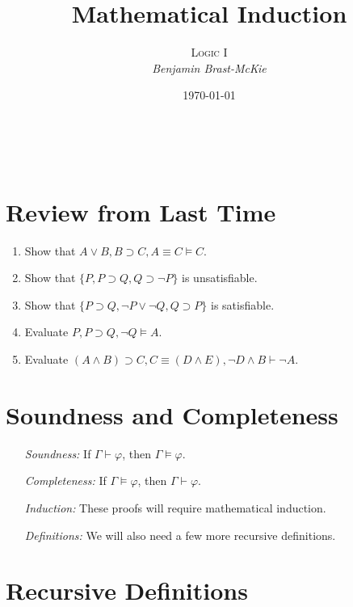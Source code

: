 \documentclass[a4paper, 11pt]{article} %
\title{\textbf{Mathematical Induction}} %
\author{\textsc{Logic I}\\ \em Benjamin Brast-McKie} %
\date{\today} %
\makeatletter
\newcommand{\set}[1]{\lbrace#1\rbrace} %
\renewcommand{\maketitle}{ %
\begin{flushright} %
{\LARGE\@title} %

\vspace{10pt} %

{\@author} %
\\\@date %

\vspace{0pt} %
\end{flushright}
}
\makeatother
\begin{document}
\maketitle %

\thispagestyle{empty}


\section*{Review from Last Time}

\begin{enumerate}
  \item Show that $A \vee B, B \supset C, A \equiv C \vDash C$.
  \item Show that $\{P, P \supset Q, Q \supset \neg P\}$ is unsatisfiable. 
  \item Show that $\set{P \supset Q, \neg P \vee \neg Q, Q \supset P}$ is satisfiable.
  \item Evaluate $P, P \supset Q, \neg Q \vDash A$.
  \item Evaluate $(A \wedge B) \supset C, C \equiv (D \wedge E), \neg D \wedge B \vdash \neg A$.
\end{enumerate}


\section*{Soundness and Completeness}

\begin{enumerate}
  \item[\it Soundness:] If $\Gamma \vdash \varphi$, then $\Gamma \vDash \varphi$.
  \item[\it Completeness:] If $\Gamma \vDash \varphi$, then $\Gamma \vdash \varphi$.
  \item[\it Induction:] These proofs will require mathematical induction. 
  \item[\it Definitions:] We will also need a few more recursive definitions.
\end{enumerate}



\section*{Recursive Definitions}
\end{document}
